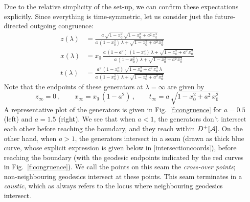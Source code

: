\documentclass[12pt]{article}
\def\regA{{\cal A}}
\begin{document}
Due to the relative simplicity of the set-up, we can confirm these expectations explicitly.  Since everything is time-symmetric, let us consider just the future-directed outgoing congruence:
%
\begin{equation}\begin{split}
z(\lambda) &= \frac{a \, \sqrt{1-x_0^2} \, \sqrt{1-x_0^2+a^2 \, x_0^2}}
{a \, (1-x_0^2) \, \lambda +\sqrt{1-x_0^2+a^2 \, x_0^2}} 
\\
x(\lambda) &= x_0 \, \frac{a \, (1-a^2) \, (1-x_0^2) \, \lambda + \sqrt{1-x_0^2+a^2 \, x_0^2}}
{a \, (1-x_0^2) \, \lambda +\sqrt{1-x_0^2+a^2 \, x_0^2}}  
\\
t(\lambda) &= \frac{a^2 \, (1-x_0^2) \,  \sqrt{1-x_0^2+a^2 \, x_0^2} \, \lambda}
{a \, (1-x_0^2) \, \lambda +\sqrt{1-x_0^2+a^2 \, x_0^2}} 
\label{ellipsegeods}
\end{split}\end{equation}	
%
Note that the endpoints of these generators at $\lambda = \infty$ are given by 
%
\begin{equation}
z_\infty = 0 \ , \qquad
x_\infty = x_0 \, (1-a^2) \ , \qquad
t_\infty = a \, \sqrt{1-x_0^2+a^2 \, x_0^2}
\label{}
\end{equation}	
%
A representative plot of the generators is given in Fig.~\ref{f:congruence} for $a=0.5$ (left) and $a=1.5$ (right).  We see that when $a<1$, the generators don't intersect each other before reaching the boundary, and they reach within $D^+[\regA]$.  On the other hand, when $a>1$, the generators intersect in a seam (drawn as thick blue curve, whose explicit expression is given below in \eqref{intersectioncoords}), before reaching the boundary (with the geodesic endpoints indicated by the red curves in Fig.~\ref{f:congruence}). We call the points on this seam the {\em cross-over points}; non-neighbouring geodesics intersect at these points.  This seam terminates in a {\em caustic}, which as always  refers to the locus  where neighbouring geodesics intersect.
\end{document}
